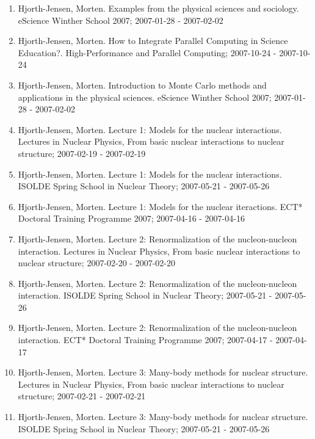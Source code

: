 \documentclass[%
oneside,                 %
final,                   %
10pt]{article}
\begin{document}
\begin{enumerate}
\item Hjorth-Jensen, Morten.  Examples from the physical sciences and sociology. eScience Winther School 2007; 2007-01-28 - 2007-02-02

\item Hjorth-Jensen, Morten.  How to Integrate Parallel Computing in Science Education?. High-Performance and Parallel Computing; 2007-10-24 - 2007-10-24

\item Hjorth-Jensen, Morten.  Introduction to Monte Carlo methods and applications in the physical sciences. eScience Winther School 2007; 2007-01-28 - 2007-02-02

\item Hjorth-Jensen, Morten.  Lecture 1: Models for the nuclear interactions. Lectures in Nuclear Physics, From basic nuclear interactions to nuclear structure; 2007-02-19 - 2007-02-19

\item Hjorth-Jensen, Morten.  Lecture 1: Models for the nuclear interactions. ISOLDE Spring School in Nuclear Theory; 2007-05-21 - 2007-05-26

\item Hjorth-Jensen, Morten.  Lecture 1: Models for the nuclear iteractions. ECT* Doctoral Training Programme 2007; 2007-04-16 - 2007-04-16

\item Hjorth-Jensen, Morten.  Lecture 2: Renormalization of the nucleon-nucleon interaction. Lectures in Nuclear Physics, From basic nuclear interactions to nuclear structure; 2007-02-20 - 2007-02-20

\item Hjorth-Jensen, Morten.  Lecture 2: Renormalization of the nucleon-nucleon interaction. ISOLDE Spring School in Nuclear Theory; 2007-05-21 - 2007-05-26

\item Hjorth-Jensen, Morten.  Lecture 2: Renormalization of the nucleon-nucleon interaction. ECT* Doctoral Training Programme 2007; 2007-04-17 - 2007-04-17

\item Hjorth-Jensen, Morten.  Lecture 3: Many-body methods for nuclear structure. Lectures in Nuclear Physics, From basic nuclear interactions to nuclear structure; 2007-02-21 - 2007-02-21

\item Hjorth-Jensen, Morten.  Lecture 3: Many-body methods for nuclear structure. ISOLDE Spring School in Nuclear Theory; 2007-05-21 - 2007-05-26


\end{enumerate}
\end{document}

